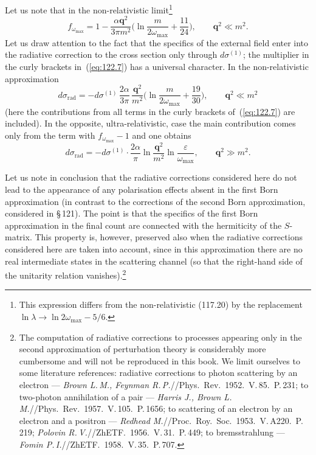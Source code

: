 
Let us note that in the non-relativistic limit\footnote{This expression differs from the non-relativistic (117.20) by the replacement $\ln\lambda \to \ln 2\omega_{\max} - 5/6$.}
\begin{equation}
f_{\omega_{\max}} = 1 - \frac{\alpha\mathbf{q}^2}{3\pi m^2}\biggl(\ln\frac{m}{2\omega_{\max}} + \frac{11}{24}\biggr), \qquad \mathbf{q}^2 \ll m^2.
\label{eq:122.10}
\end{equation}
Let us draw attention to the fact that the specifics of the external field enter into the radiative correction to the cross section only through $d\sigma^{(1)}$; the multiplier in the curly brackets in~(\ref{eq:122.7}) has a universal character. In the non-relativistic approximation
\begin{equation}
d\sigma_{\text{rad}} = -d\sigma^{(1)}\,\frac{2\alpha}{3\pi}\,\frac{\mathbf{q}^2}{m^2}\biggl(\ln\frac{m}{2\omega_{\max}} + \frac{19}{30}\biggr), \qquad \mathbf{q}^2 \ll m^2
\label{eq:122.11}
\end{equation}
(here the contributions from all terms in the curly brackets of~(\ref{eq:122.7}) are included). In the opposite, ultra-relativistic, case the main contribution comes only from the term with $f_{\omega_{\max}} - 1$ and one obtains
\begin{equation}
d\sigma_{\text{rad}} = -d\sigma^{(1)}\cdot\frac{2\alpha}{\pi}\ln\frac{\mathbf{q}^2}{m^2}\ln\frac{\varepsilon}{\omega_{\max}}, \qquad \mathbf{q}^2 \gg m^2.
\label{eq:122.12}
\end{equation}

Let us note in conclusion that the radiative corrections considered here do not lead to the appearance of any polarisation effects absent in the first Born approximation (in contrast to the corrections of the second Born approximation, considered in \S\,121). The point is that the specifics of the first Born approximation in the final count are connected with the hermiticity of the $S$-matrix. This property is, however, preserved also when the radiative corrections considered here are taken into account, since in this approximation there are no real intermediate states in the scattering channel (so that the right-hand side of the unitarity relation vanishes).\footnote{The computation of radiative corrections to processes appearing only in the second approximation of perturbation theory is considerably more cumbersome and will not be reproduced in this book. We limit ourselves to some literature references: radiative corrections to photon scattering by an electron --- \emph{Brown L.\,M., Feynman R.\,P.}//Phys.\ Rev.\ 1952.\ V.\,85.\ P.\,231; to two-photon annihilation of a pair --- \emph{Harris J., Brown L.\,M.}//Phys.\ Rev.\ 1957.\ V.\,105.\ P.\,1656; to scattering of an electron by an electron and a positron --- \emph{Redhead M.}//Proc.\ Roy.\ Soc.\ 1953.\ V.\,A220.\ P.\,219; \emph{Polovin R.\,V.}//ZhETF.\ 1956.\ V.\,31.\ P.\,449; to bremsstrahlung --- \emph{Fomin P.\,I.}//ZhETF.\ 1958.\ V.\,35.\ P.\,707.}
